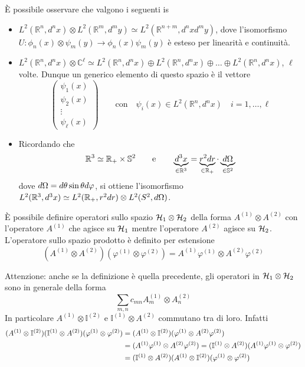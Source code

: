 \documentclass[../../FisicaTeorica.tex]{subfiles}
\begin{document}
È possibile osservare che valgono i seguenti is
\begin{itemize}
\item $L^2(\mathbb R^n, d^n x) \otimes L^2(\mathbb R^m, d^m y) \simeq L^2(\mathbb R^{n+m}, d^n x d^m y)$, dove l’isomorfismo $U: \phi_n(x) \otimes \psi_m(y) \to \phi_n(x) \psi_m(y)$ è esteso per linearità e continuità.
\item $L^2(\mathbb R^n, d^n x) \otimes \mathbb C^\ell \simeq L^2(\mathbb R^n, d^n x) \oplus L^2(\mathbb R^n, d^n x) \oplus \dots \oplus L^2(\mathbb R^n, d^n x)$, $\ell$ volte. Dunque un generico elemento di questo spazio è il vettore 
\[
\begin{pmatrix} \psi_1(x) \\ \psi_2(x) \\ \vdots \\ \psi_\ell(x) \end{pmatrix} \qquad \text{con} \quad  \psi_i(x) \in L^2(\mathbb R^n, d^n x) \quad i = 1, \dots, \ell
\]
\item Ricordando che
\[
\mathbb R^3 \simeq \mathbb R_+ \times \mathbb S^2  \qquad \text{e} \qquad \underbrace{d^3 x}_{\in \mathbb R^3} = \underbrace{r^2 d r}_{\in \mathbb R_+} \cdot \underbrace{d \Omega}_{\in \mathbb S^2}
\]
dove $d \Omega = d \theta \sin\theta d\varphi$, si ottiene l’isomorfismo $L^2(\mathbb R^3, d^3 x) \simeq L^2(\mathbb R_+, r^2 d r) \otimes L^2(S^2, d \Omega)$.
\end{itemize}

\begin{dfn}
È possibile definire operatori sullo spazio $\mathcal{H}_1 \otimes \mathcal{H}_2$ della forma $A^{(1)} \otimes A^{(2)}$ con l’operatore $A^{(1)}$ che agisce su $\mathcal{H}_1$ mentre l’operatore $A^{(2)}$ agisce su $\mathcal{H}_2$.  L’operatore sullo spazio prodotto è definito per estensione
\[
(A^{(1)} \otimes A^{(2)})(\varphi^{(1)} \otimes \varphi^{(2)}) = A^{(1)} \varphi^{(1)} \otimes A^{(2)} \varphi^{(2)}
\]
\end{dfn}

\begin{remark}
Attenzione: anche se la definizione è quella precedente, gli operatori in $\mathcal{H}_1 \otimes \mathcal{H}_2$ sono in generale della forma
\[
\sum_{m,n} c_{mn}  A_m^{(1)} \otimes A_n^{(2)}
\]
In particolare $A^{(1)} \otimes \mathbb{I}^{(2)}$ e $\mathbb{I}^{(1)} \otimes A^{(2)}$ commutano tra di loro. Infatti
\begin{align}
(A^{(1)} \otimes \mathbb{I}^{(2)}) (\mathbb{I}^{(1)} \otimes A^{(2)}) (\varphi^{(1)} \otimes \varphi^{(2)}) & = (A^{(1)} \otimes \mathbb{I}^{(2)}) (\varphi^{(1)} \otimes  A^{(2)} \varphi^{(2)}) \notag \\
& = (A^{(1)} \varphi^{(1)} \otimes A^{(2)} \varphi^{(2)}) = (\mathbb{I}^{(1)} \otimes A^{(2)}) (A^{(1)} \varphi^{(1)} \otimes \varphi^{(2)}) \notag \\
& = (\mathbb{I}^{(1)} \otimes A^{(2)}) (A^{(1)} \otimes \mathbb{I}^{(2)}) (\varphi^{(1)} \otimes \varphi^{(2)}) \notag
\end{align}
\end{remark}
\end{document}
